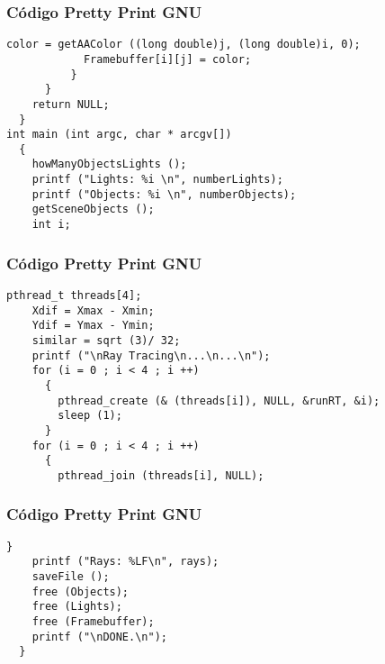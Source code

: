 \documentclass{beamer}
\begin{document}
\begin{frame}[fragile]
\frametitle{C\'odigo Pretty Print GNU}
\begin{lstlisting}[style=CStyle]
            color = getAAColor ((long double)j, (long double)i, 0);
            Framebuffer[i][j] = color;
          }
      }
    return NULL;
  }
int main (int argc, char * arcgv[])
  {
    howManyObjectsLights ();
    printf ("Lights: %i \n", numberLights);
    printf ("Objects: %i \n", numberObjects);
    getSceneObjects ();
    int i;
\end{lstlisting}
\end{frame}
\begin{frame}[fragile]
\frametitle{C\'odigo Pretty Print GNU}
\begin{lstlisting}[style=CStyle]
    pthread_t threads[4];
    Xdif = Xmax - Xmin;
    Ydif = Ymax - Ymin;
    similar = sqrt (3)/ 32;
    printf ("\nRay Tracing\n...\n...\n");
    for (i = 0 ; i < 4 ; i ++)
      {
        pthread_create (& (threads[i]), NULL, &runRT, &i);
        sleep (1);
      }
    for (i = 0 ; i < 4 ; i ++)
      {
        pthread_join (threads[i], NULL);
\end{lstlisting}
\end{frame}
\begin{frame}[fragile]
\frametitle{C\'odigo Pretty Print GNU}
\begin{lstlisting}[style=CStyle]
      }
    printf ("Rays: %LF\n", rays);
    saveFile ();
    free (Objects);
    free (Lights);
    free (Framebuffer);
    printf ("\nDONE.\n");
  }
\end{lstlisting}
\end{frame}
\end{document}
